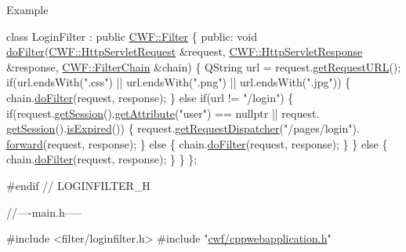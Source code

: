 \begin{DoxyParagraph}{Example}
\begin{DoxyCode}
\textcolor{keyword}{class }LoginFilter : \textcolor{keyword}{public} \hyperlink{class_c_w_f_1_1_filter}{CWF::Filter}
\{
\textcolor{keyword}{public}:
    \textcolor{keywordtype}{void} \hyperlink{class_c_w_f_1_1_filter_aa66add142c4f09a0b26f8d97a59650ba}{doFilter}(\hyperlink{class_c_w_f_1_1_http_servlet_request}{CWF::HttpServletRequest} &request, 
      \hyperlink{class_c_w_f_1_1_http_servlet_response}{CWF::HttpServletResponse} &response, \hyperlink{class_c_w_f_1_1_filter_chain}{CWF::FilterChain} &chain)
    \{
        QString url = request.\hyperlink{class_c_w_f_1_1_http_servlet_request_a9408f2866aa0fc49242e74b85a514869}{getRequestURL}();
        \textcolor{keywordflow}{if}(url.endsWith(\textcolor{stringliteral}{".css"}) || url.endsWith(\textcolor{stringliteral}{".png"}) || url.endsWith(\textcolor{stringliteral}{".jpg"}))
        \{
            chain.\hyperlink{class_c_w_f_1_1_filter_chain_a438bc63ea1fa575ae8882fb05a31feca}{doFilter}(request, response);
        \}
        \textcolor{keywordflow}{else} \textcolor{keywordflow}{if}(url != \textcolor{stringliteral}{"/login"})
        \{
            \textcolor{keywordflow}{if}(request.\hyperlink{class_c_w_f_1_1_http_servlet_request_aad0cadb7d24101705a6f83b82eb7c025}{getSession}().\hyperlink{class_c_w_f_1_1_http_session_a44f59df340395d9c298c93ee5307b392}{getAttribute}(\textcolor{stringliteral}{"user"}) == \textcolor{keyword}{nullptr} || request.
      \hyperlink{class_c_w_f_1_1_http_servlet_request_aad0cadb7d24101705a6f83b82eb7c025}{getSession}().\hyperlink{class_c_w_f_1_1_http_session_aebc716e79896ed61527ff4dac933558e}{isExpired}())
            \{
                request.\hyperlink{class_c_w_f_1_1_http_servlet_request_a0ce93d793a178c7e0e5fef4044b48bdc}{getRequestDispatcher}(\textcolor{stringliteral}{"/pages/login"}).
      \hyperlink{class_c_w_f_1_1_request_dispatcher_a075c11ff233f217196764899f9edf7d0}{forward}(request, response);
            \}
            \textcolor{keywordflow}{else}
            \{
                chain.\hyperlink{class_c_w_f_1_1_filter_chain_a438bc63ea1fa575ae8882fb05a31feca}{doFilter}(request, response);
            \}
         \}
         \textcolor{keywordflow}{else}
         \{
             chain.\hyperlink{class_c_w_f_1_1_filter_chain_a438bc63ea1fa575ae8882fb05a31feca}{doFilter}(request, response);
         \}
    \}
\};

\textcolor{preprocessor}{#endif // LOGINFILTER\_H}

\textcolor{comment}{//----main.h-----}

\textcolor{preprocessor}{#include <filter/loginfilter.h>}
\textcolor{preprocessor}{#include "\hyperlink{cppwebapplication_8h}{cwf/cppwebapplication.h}"}


\end{DoxyCode}
\end{DoxyParagraph}
